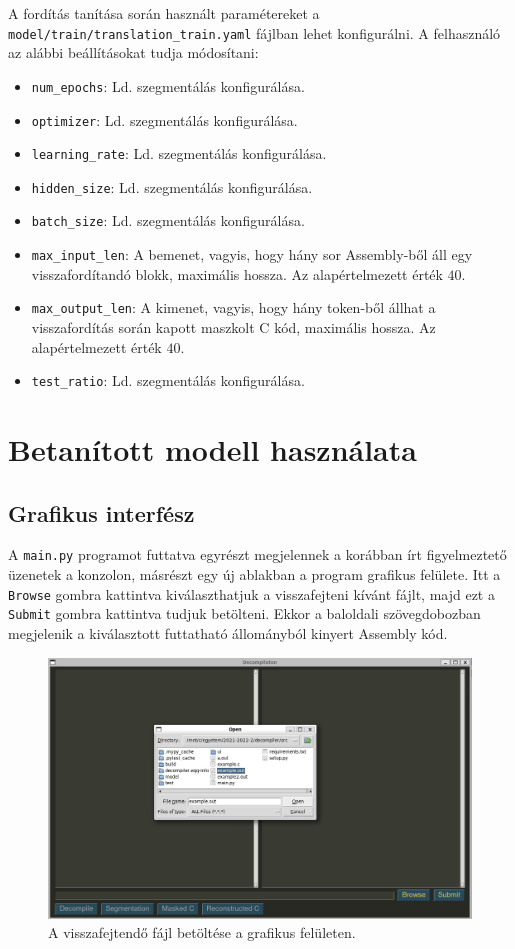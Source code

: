 A fordítás tanítása során használt paramétereket
a \texttt{model/train/translation\_train.yaml} fájlban lehet konfigurálni.
A felhasználó az alábbi beállításokat tudja módosítani:
\begin{itemize}
    \item \texttt{num\_epochs}: Ld. szegmentálás konfigurálása.
    \item \texttt{optimizer}: Ld. szegmentálás konfigurálása.
    \item \texttt{learning\_rate}: Ld. szegmentálás konfigurálása.
    \item \texttt{hidden\_size}: Ld. szegmentálás konfigurálása.
    \item \texttt{batch\_size}: Ld. szegmentálás konfigurálása.
    \item \texttt{max\_input\_len}: A bemenet, vagyis, hogy hány sor
        Assembly-ből áll egy visszafordítandó blokk, maximális hossza. Az
        alapértelmezett érték $40$.
    \item \texttt{max\_output\_len}: A kimenet, vagyis, hogy hány token-ből
        állhat a visszafordítás során kapott maszkolt C kód, maximális hossza.
        Az alapértelmezett érték $40$.
    \item \texttt{test\_ratio}: Ld. szegmentálás konfigurálása.
\end{itemize}

\section{Betanított modell használata}
\subsection{Grafikus interfész}
A \texttt{main.py} programot futtatva egyrészt megjelennek a korábban írt
figyelmeztető üzenetek a konzolon, másrészt egy új ablakban a program grafikus
felülete. Itt a \texttt{Browse} gombra kattintva kiválaszthatjuk
a visszafejteni kívánt fájlt, majd ezt a \texttt{Submit} gombra kattintva
tudjuk betölteni. Ekkor a baloldali szövegdobozban megjelenik a kiválasztott futtatható
állományból kinyert Assembly kód.

\begin{figure}[H]
	\centering
	\includegraphics[width=1.0\textwidth]{images/file_browse.png}
	\caption{A visszafejtendő fájl betöltése a grafikus felületen.}
	\label{fig:file_browse}
\end{figure}

